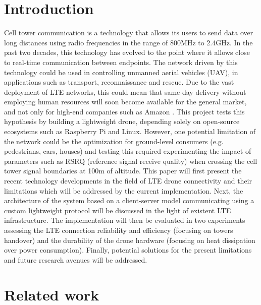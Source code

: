 \documentclass{IEEEtran}
\begin{document}
\section{Introduction}
Cell tower communication is a technology that allows its users to send data over long distances using radio frequencies in the range of 800MHz to 2.4GHz. In the past two decades, this technology has evolved to the point where it allows close to real-time communication between endpoints. The network driven by this technology could be used in controlling unmanned aerial vehicles (UAV), in applications such as transport, reconnaissance and rescue. Due to the vast deployment of LTE networks, this could mean that same-day delivery without employing human resources will soon become available for the general market, and not only for high-end companies such as Amazon \citep{wikipediacontributors_2019_amazon}.
\newline
\newline
This project tests this hypothesis by building a lightweight drone, depending solely on open-source ecosystems such as Raspberry Pi and Linux. However, one potential limitation of the network could be the optimization for ground-level consumers (e.g. pedestrians, cars, houses) and testing this required experimenting the impact of parameters such as RSRQ (reference signal receive quality) when crossing the cell tower signal boundaries at 100m of altitude.
\newline
\newline
This paper will first present the recent technology developments in the field of LTE drone connectivity and their limitations which will be addressed by the current implementation.  Next, the architecture of the system based on a  client-server model communicating using a custom lightweight protocol will be discussed in the light of existent LTE infrastructure. The implementation will then be evaluated in two experiments assessing the LTE connection reliability and efficiency (focusing on towers handover) and the durability of the drone hardware (focusing on heat dissipation over power consumption). Finally, potential solutions for the present limitations and future research avenues will be addressed.
\section{Related work}
\end{document}
